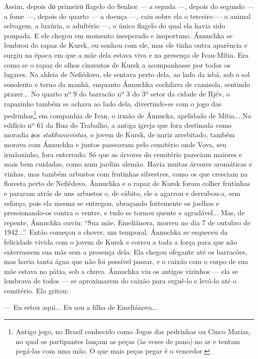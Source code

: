 Assim, depois dо primeirо flagelo do Senhor --- a espada ---, depois do
segundo --- a fome ---, depois do quarto --- a doença ---, caiu sobre
ela o terceiro --- o animal selvagem, a luxúria, o adultério ---, o
único flagelo do qual ela havia sido poupada. E ele chegou em momento
inesperado e inoportuno. Ánnuchka se lembrou do rapaz de Kursk, ou
sonhou com ele, mas ele tinha outra aparência e surgiu na época em que a
mãe dela estava viva e na presença de Ivan-Mítia. Era como se o rapaz de
olhos cinzentos de Kursk a acompanhasse por todos os lugares. Na aldeia
de Nefiédovo, ele sentava perto dela, ao lado da isbá, sob o sol
sonolento e terno da manhã, enquanto Ánnuchka cochilava de camisola,
sentindo prazer... No quarto nº 9 do barracão nº 3 do 3º setor da cidade
de Rjév, o rapazinho também se achava ao lado dela, divertindo-se com o
jogo das pedrinhas\footnote{Antigo jogo, no Brasil conhecido como Jogos
  das pedrinhas ou Cinco Marias, no qual os partipantes lançam as peças
  (às vezes de pano) no ar e tentam pegá-las com uma mão. O que mais
  peças pegar é o vencedor.} em companhia de Ivan, o irmão de Ánnucka,
apelidado de Mítia... No edifício nº 61 da Rua do Trabalho, a antiga
igreja que fora destinada como moradia аos \emph{stakhanovistas}, o
jovem de Kursk, de nariz arrebitado, também morava com Ánnuchka e juntos
passeavam pelo cemitério onde Vova, seu irmãozinho, fora enterrado. Só
que as árvores do cemitério pareciam maiores e mais bem cuidadas, como
num jardim alemão. Havia muitas árvores aromáticas e vinhas, mas também
arbustos com frutinhas silvestres, como os que cresciam na floresta
perto de Nefiédovo. Ánnuchka e o rapaz de Kursk foram colher frutinhas e
pararam atrás de uns arbustos e, de súbito, ele a agarrou e derrubou-a,
sem esforço, pois ela mesma se entregou, abraçando fortemente os joelhos
e pressionando-os contra o ventre, e tudo se tornou quente e
agradável... Mas, de repente, Ánnuchka ouviu: ``Sua mãe, Emeliánova,
morreu no dia 7 de outubro de 1942...''. Então começou a chover, um
temporal. Ánnuchka se esqueceu da felicidade vivida com o jovem de Kursk
e correu a toda a força para que não enterrassem sua mãe sem a presença
dela. Ela chegou ofegante até os barracões, mas havia tanta água que não
foi possível passar, e o caixão com o corpo de sua mãe estava no pátio,
sob a chuva. Ánnuchka viu os antigos vizinhos --- ela se lembrava de
todos --- se aproximarem do caixão para erguê-lo e levá-lo até o
cemitério. Ela gritou:

--- Eu estou aqui... Eu sou a filha de Emeliánova...

